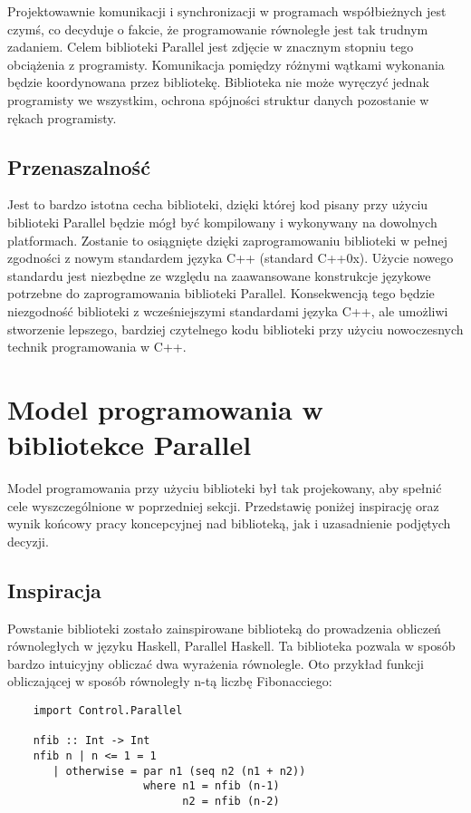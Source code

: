   Projektowawnie komunikacji i synchronizacji w programach współbieżnych jest czymś, co decyduje o fakcie, że programowanie równoległe jest tak trudnym zadaniem.
  Celem biblioteki Parallel jest zdjęcie w znacznym stopniu tego obciążenia z programisty.
  Komunikacja pomiędzy różnymi wątkami wykonania będzie koordynowana przez bibliotekę.
  Biblioteka nie może wyręczyć jednak programisty we wszystkim, ochrona spójności struktur danych pozostanie w rękach programisty.
  
\subsection{Przenaszalność}
  
  Jest to bardzo istotna cecha biblioteki, dzięki której kod pisany przy użyciu biblioteki Parallel będzie mógł być kompilowany i wykonywany na dowolnych platformach.
  Zostanie to osiągnięte dzięki zaprogramowaniu biblioteki w pełnej zgodności z nowym standardem języka C++ (standard C++0x).
  Użycie nowego standardu jest niezbędne ze względu na zaawansowane konstrukcje językowe potrzebne do zaprogramowania biblioteki Parallel.
  Konsekwencją tego będzie niezgodność biblioteki z wcześniejszymi standardami języka C++, ale umożliwi stworzenie lepszego, bardziej czytelnego kodu biblioteki przy użyciu nowoczesnych technik programowania w C++.

\section{Model programowania w bibliotekce Parallel}

  Model programowania przy użyciu biblioteki był tak projekowany, aby spełnić cele wyszczególnione w poprzedniej sekcji.
  Przedstawię poniżej inspirację oraz wynik końcowy pracy koncepcyjnej nad biblioteką, jak i uzasadnienie podjętych decyzji.

\subsection{Inspiracja}

  Powstanie biblioteki zostało zainspirowane biblioteką do prowadzenia obliczeń równoległych w języku Haskell, Parallel Haskell\cite{parhas}.
  Ta biblioteka pozwala w sposób bardzo intuicyjny obliczać dwa wyrażenia równolegle.
  Oto przykład funkcji obliczającej w sposób równoległy n-tą liczbę Fibonacciego:
  \begin{verbatim}
    import Control.Parallel

    nfib :: Int -> Int
    nfib n | n <= 1 = 1
       | otherwise = par n1 (seq n2 (n1 + n2))
                     where n1 = nfib (n-1)
                           n2 = nfib (n-2)
  \end{verbatim}
  
